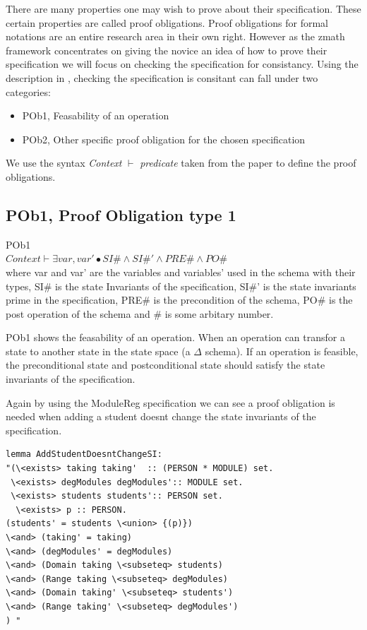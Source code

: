 There are many properties one may wish to prove about their specification. These certain properties are called proof obligations. Proof obligations for formal notations are an entire research area in their own right. However as the \gls{zmath} framework concentrates on giving the novice an idea of how to prove their specification we will focus on checking the specification for consistancy. Using the description in \cite{DBLP:conf/icsea/WenMZ06}, checking the specification is consitant can fall under two categories:

\begin{itemize}
\item POb1, Feasability of an operation
\item POb2, Other specific proof obligation for the chosen specification
\end{itemize}

We use the syntax \textit{Context} $\vdash$ \textit{predicate} taken from the paper to define the proof obligations.

\subsection{POb1, Proof Obligation type 1}

\begin{defin}\label{defa}POb1\\

$Context \vdash \exists var, var' \bullet SI\# \land SI\#' \land PRE\# \land PO\#$ \\

\noindent where var and var' are the variables and variables' used in the schema with their types, SI\# is the state Invariants of the specification, SI\#' is the state invariants prime in the specification, PRE\# is the precondition of the schema, PO\# is the post operation of the schema and \# is some arbitary number.
\end{defin}

POb1 shows the feasability of an operation. When an operation can transfor a state to another state in the state space (a $\Delta$ schema). If an operation is feasible, the preconditional state and postconditional state should satisfy the state invariants of the specification.

Again by using the ModuleReg specification we can see a proof obligation is needed when adding a student doesnt change the state invariants of the specification.

\begin{verbatim}
lemma AddStudentDoesntChangeSI:
"(\<exists> taking taking'  :: (PERSON * MODULE) set.
 \<exists> degModules degModules':: MODULE set.
 \<exists> students students':: PERSON set.
  \<exists> p :: PERSON.
(students' = students \<union> {(p)}) 
\<and> (taking' = taking)
\<and> (degModules' = degModules)
\<and> (Domain taking \<subseteq> students)
\<and> (Range taking \<subseteq> degModules)
\<and> (Domain taking' \<subseteq> students')
\<and> (Range taking' \<subseteq> degModules')
) "
\end{verbatim}

